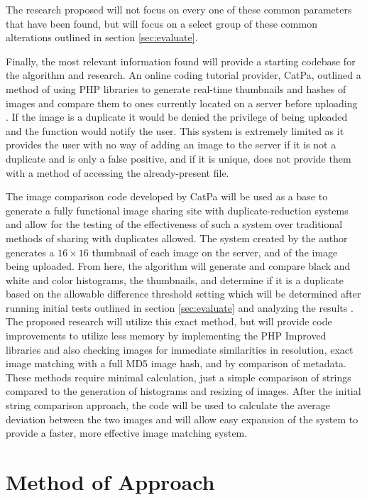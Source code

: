 \documentclass[11pt]{article}
\begin{document}
The research proposed will not focus on every one of these common parameters that have been found, but will focus on a select group of these common alterations outlined in section \ref{sec:evaluate}.

Finally, the most relevant information found will provide a starting codebase for the algorithm and research. An online coding tutorial provider, CatPa, outlined a method of using PHP libraries to generate real-time thumbnails and hashes of images and compare them to ones currently located on a server before uploading \cite{catpa:gdcode}. If the image is a duplicate it would be denied the privilege of being uploaded and the function would notify the user. This system is extremely limited as it provides the user with no way of adding an image to the server if it is not a duplicate and is only a false positive, and if it is unique, does not provide them with a method of accessing the already-present file.

The image comparison code developed by CatPa will be used as a base to generate a fully functional image sharing site with duplicate-reduction systems and allow for the testing of the effectiveness of such a system over traditional methods of sharing with duplicates allowed. The system created by the author \cite{catpa:gdcode} generates a $16\times 16$ thumbnail of each image on the server, and of the image being uploaded. From here, the algorithm will generate and compare black and white and color histograms, the thumbnails, and determine if it is a duplicate based on the allowable difference threshold setting which will be determined after running initial tests outlined in section \ref{sec:evaluate} and analyzing the results \cite{catpa:gdcode}. The proposed research will utilize this exact method, but will provide code improvements to utilize less memory by implementing the PHP Improved libraries and also checking images for immediate similarities in resolution, exact image matching with a full MD5 image hash, and by comparison of metadata. These methods require minimal calculation, just a simple comparison of strings compared to the generation of histograms and resizing of images. After the initial string comparison approach, the code will be used to calculate the average deviation between the two images and will allow easy expansion of the system to provide a faster, more effective image matching system.

\vspace*{-.2in}
\section{Method of Approach}
\label{sec:method}
\vspace*{-.1in}
\end{document}

